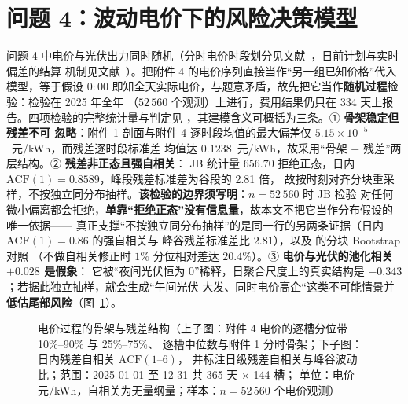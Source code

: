
\section{问题 4：波动电价下的风险决策模型}\label{chap:q4}

问题 4 中电价与光伏出力同时随机（分时电价时段划分见文献~\cite{ref1093}，日前计划与实时偏差的结算
机制见文献~\cite{ref1217}）。把附件 4 的电价序列直接当作“另一组已知价格”代入模型，等于假设
\(0{:}00\) 即知全天实际电价，与题意矛盾，故先把它当作\textbf{随机过程}检验：检验在 2025 年全年
（\(52\,560\) 个观测）上进行，费用结果仍只在 334 天上报告。四项检验的完整统计量与判定见
，其建模含义可概括为三条。① \textbf{骨架稳定但残差不可
忽略}：附件 1 剖面与附件 4 逐时段均值的最大偏差仅 \(5.15\times10^{-5}\)~元/kWh，而残差逐时段标准差
均值达 \(0.1238\)~元/kWh，故采用“骨架 \(+\) 残差”两层结构。② \textbf{残差非正态且强自相关}：
JB 统计量 \(656.70\) 拒绝正态，日内 \(\mathrm{ACF}(1)=0.8589\)，峰段残差标准差为谷段的 2.81 倍，
故按时刻对齐分块重采样，不按独立同分布抽样。\textbf{该检验的边界须写明}：\(n=52\,560\) 时 JB 检验
对任何微小偏离都会拒绝，\textbf{单靠“拒绝正态”没有信息量}，故本文不把它当作分布假设的唯一依据——
真正支撑“不按独立同分布抽样”的是同一行的另两条证据（日内 \(\mathrm{ACF}(1)=0.86\) 的强自相关与
峰谷残差标准差比 \(2.81\)），以及  的分块 Bootstrap 对照
（不做自相关修正时
\(1\%\) 分位相对差达 \(20.4\%\)）。③ \textbf{电价与光伏的池化相关 \(+0.028\) 是假象}：
它被“夜间光伏恒为 0”稀释，日聚合尺度上的真实结构是 \(-0.343\)；若据此独立抽样，就会生成“午间光伏
大发、同时电价高企“这类不可能情景并\textbf{低估尾部风险}（图~\ref{fig:q4-price}）。

\begin{figure}[htbp]
  \centering
  \caption{电价过程的骨架与残差结构（上子图：附件 4 电价的逐槽分位带 10\%--90\% 与 25\%--75\%、
           逐槽中位数与附件 1 分时骨架；下子图：日内残差自相关 \(\mathrm{ACF}(1\text{--}6)\)，
           并标注日级残差自相关与峰谷波动比；范围：2025-01-01 至 12-31 共 365 天 \(\times\) 144 槽；
           单位：电价 元/kWh，自相关为无量纲量；样本：\(n=52\,560\) 个电价观测）}
  \label{fig:q4-price}
\end{figure}

